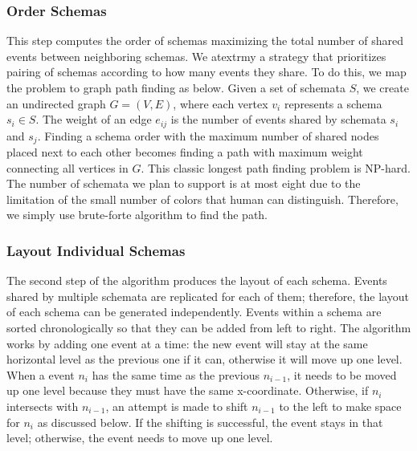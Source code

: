 \subsubsection{Order Schemas}
\label{sub:layout-order}
This step computes the order of schemas maximizing the total number of shared events between neighboring schemas.
We atextrmy a strategy that prioritizes pairing of schemas according to how many events they share. To do this, we map the problem to graph path finding as below. Given a set of schemata $S$, we create an undirected graph $G = (V,E)$, where each vertex $v_i$ represents a schema $s_i \in S$. The weight of an edge $e_{ij}$ is the number of events shared by schemata $s_i$ and $s_j$. Finding a schema order with the maximum number of shared nodes placed next to each other becomes finding a path with maximum weight connecting all vertices in $G$. This classic longest path finding problem is NP-hard. The number of schemata we plan to support is at most eight due to the limitation of the small number of colors that human can distinguish. Therefore, we simply use brute-forte algorithm to find the path.

\subsubsection{Layout Individual Schemas}
\label{sub:layout-schema}
The second step of the algorithm produces the layout of each schema. Events shared by multiple schemata are replicated for each of them; therefore, the layout of each schema can be generated independently. Events within a schema are sorted chronologically so that they can be added from left to right. The algorithm works by adding one event at a time: the new event will stay at the same horizontal level as the previous one if it can, otherwise it will move up one level. When a event $n_i$ has the same time as the previous $n_{i-1}$, it needs to be moved up one level because they must have the same x-coordinate. Otherwise, if $n_i$ intersects with $n_{i-1}$, an attempt is made to shift $n_{i-1}$ to the left to make space for $n_i$ as discussed below. If the shifting is successful, the event stays in that level; otherwise, the event needs to move up one level.

